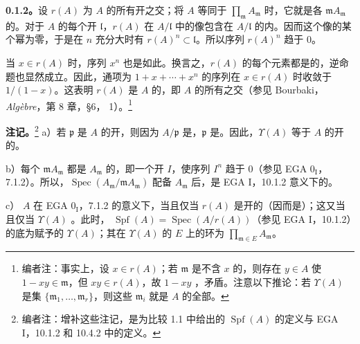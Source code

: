 \textbf{0.1.2。}设 $r(A)$ 为 $A$ 的所有开之交；将 $A$ 等同于 $\prod_{\mathfrak m}A_{\mathfrak m}$ 时，它就是各 $\mathfrak mA_{\mathfrak m}$ 的。对于 $A$ 的每个开 $\mathfrak l$，$r(A)$ 在 $A/\mathfrak l$ 中的像包含在 $A/\mathfrak l$ 的内。因而这个像的某个幂为零，于是在 $n$ 充分大时有 $r(A)^n\subset\mathfrak l$。所以序列 $r(A)^n$ 趋于 $0$。

当 $x\in r(A)$ 时，序列 $x^n$ 也是如此。换言之，$r(A)$ 的每个元素都是的，逆命题也显然成立。因此，通项为 $1+x+\cdots+x^n$ 的序列在 $x\in r(A)$ 时收敛于 $1/(1-x)$。这表明 $r(A)$ 是 $A$ 的，即 $A$ 的所有之交（参见 Bourbaki，\emph{Algèbre}，第 8 章，\S 6， 1）。\footnote{编者注：事实上，设 $x\in r(A)$；若 $\mathfrak m$ 是不含 $x$ 的，则存在 $y\in A$ 使 $1-xy\in\mathfrak m$，但 $xy\in r(A)$，故 $1-xy$ ，矛盾。注意以下推论：若 $\Upsilon(A)$ 是集 $\{\mathfrak m_1,\ldots,\mathfrak m_r\}$，则这些 $\mathfrak m_i$ 就是 $A$ 的全部。}

\textbf{注记。}\footnote{编者注：增补这些注记，是为比较 1.1 中给出的 $\operatorname{Spf}(A)$ 的定义与 EGA I，10.1.2 和 10.4.2 中的定义。}
 a）若 $\mathfrak p$ 是 $A$ 的开，则因为 $A/\mathfrak p$ 是，$\mathfrak p$ 是。因此，$\Upsilon(A)$ 等于 $A$ 的开的。

b）每个 $\mathfrak mA_{\mathfrak m}$ 都是 $A_{\mathfrak m}$ 的，即一个开 $I$，使序列 $I^n$ 趋于 $0$（参见 EGA $0_{\mathrm I}$，7.1.2）。所以，$\operatorname{Spec}(A_{\mathfrak m}/\mathfrak mA_{\mathfrak m})$ 配备 $A_{\mathfrak m}$ 后，是 EGA I，10.1.2 意义下的。

c） $A$ 在 EGA $0_{\mathrm I}$，7.1.2 的意义下，当且仅当 $r(A)$ 是开的（因而是）；这又当且仅当 $\Upsilon(A)$ 。此时， $\operatorname{Spf}(A)=\operatorname{Spec}(A/r(A))$（参见 EGA I，10.1.2）的底为赋予的 $\Upsilon(A)$；其在 $\Upsilon(A)$ 的 $E$ 上的环为 $\prod_{\mathfrak m\in E}A_{\mathfrak m}$。

